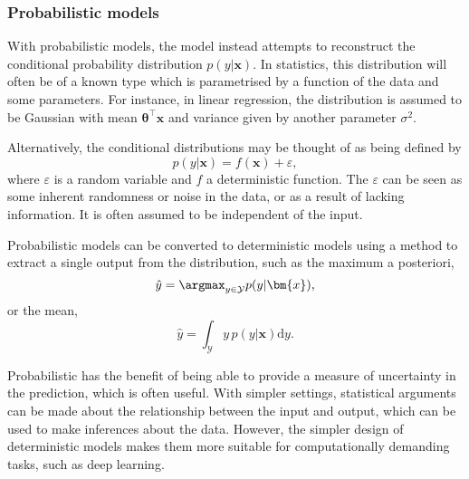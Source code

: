 \subsubsection{Probabilistic models}
With probabilistic models, the model instead attempts to reconstruct the conditional probability distribution $p(y|\bm{x})$.
In statistics, this distribution will often be of a known type which is parametrised by a function of the data and some parameters.
For instance, in linear regression, the distribution is assumed to be Gaussian with mean $\bm{\theta}^\top\bm{x}$ and variance given by another parameter $\sigma^2$.

Alternatively, the conditional distributions may be thought of as being defined by
\begin{equation}
    p(y|\bm{x}) = f(\bm{x}) + \varepsilon,
    \label{eq:probabilistic_model}
\end{equation}
where $\varepsilon$ is a random variable and $f$ a deterministic function.
The $\varepsilon$ can be seen as some inherent randomness or noise in the data, or as a result of lacking information.
It is often assumed to be independent of the input.

Probabilistic models can be converted to deterministic models using a method to extract a single output from the distribution, such as the maximum a posteriori,
\begin{equation}
    \hat{y} = \argmax_{y\in\mathcal{Y}} p(y|\bm{x}),
\end{equation}
or the mean,
\begin{equation}
    \hat{y} = \int_{\mathcal{Y}} y \, p(y|\bm{x})\mathrm{d}y.
\end{equation}

Probabilistic has the benefit of being able to provide a measure of uncertainty in the prediction, which is often useful.
With simpler settings, statistical arguments can be made about the relationship between the input and output, which can be used to make inferences about the data.
However, the simpler design of deterministic models makes them more suitable for computationally demanding tasks, such as deep learning.

